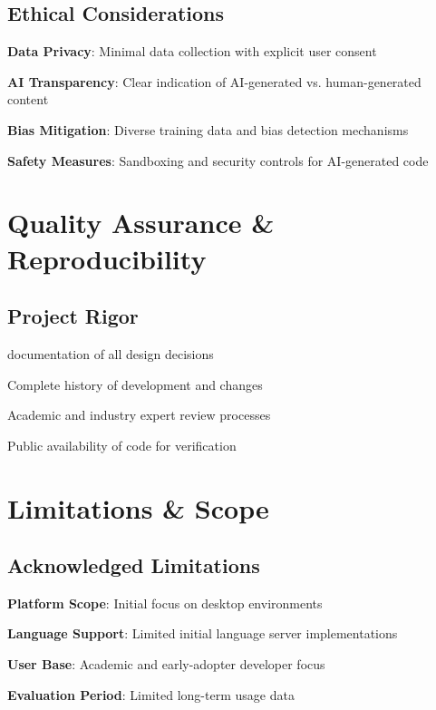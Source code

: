 \subsection*{Ethical Considerations}
\begin{compactlist}
    \item \textbf{Data Privacy}: Minimal data collection with explicit user consent
    \item \textbf{AI Transparency}: Clear indication of AI-generated vs. human-generated content
    \item \textbf{Bias Mitigation}: Diverse training data and bias detection mechanisms
    \item \textbf{Safety Measures}: Sandboxing and security controls for AI-generated code
\end{compactlist}

\section*{Quality Assurance \& Reproducibility}

\subsection*{Project Rigor}
\begin{description}[leftmargin=3cm,labelwidth=2.5cm]
    \item[\textbf{Documentation}]  documentation of all design decisions
    \item[\textbf{Version Control}] Complete history of development and changes
    \item[\textbf{Peer Review}] Academic and industry expert review processes
    \item[\textbf{Open Source}] Public availability of code for verification
\end{description}

\section*{Limitations \& Scope}

\subsection*{Acknowledged Limitations}
\begin{compactlist}
    \item \textbf{Platform Scope}: Initial focus on desktop environments
    \item \textbf{Language Support}: Limited initial language server implementations
    \item \textbf{User Base}: Academic and early-adopter developer focus
    \item \textbf{Evaluation Period}: Limited long-term usage data
\end{compactlist}

